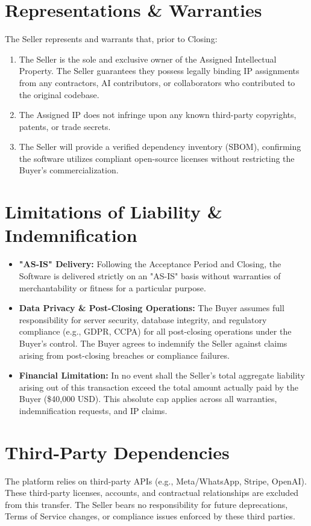 \documentclass[11pt,a4paper]{report}
\begin{document}
\section{Representations \& Warranties}
The Seller represents and warrants that, prior to Closing:
\begin{enumerate}
    \item The Seller is the sole and exclusive owner of the Assigned Intellectual Property. The Seller guarantees they possess legally binding IP assignments from any contractors, AI contributors, or collaborators who contributed to the original codebase.
    \item The Assigned IP does not infringe upon any known third-party copyrights, patents, or trade secrets.
    \item The Seller will provide a verified dependency inventory (SBOM), confirming the software utilizes compliant open-source licenses without restricting the Buyer's commercialization.
\end{enumerate}

\section{Limitations of Liability \& Indemnification}
\begin{itemize}
    \item \textbf{"AS-IS" Delivery:} Following the Acceptance Period and Closing, the Software is delivered strictly on an "AS-IS" basis without warranties of merchantability or fitness for a particular purpose.
    \item \textbf{Data Privacy \& Post-Closing Operations:} The Buyer assumes full responsibility for server security, database integrity, and regulatory compliance (e.g., GDPR, CCPA) for all post-closing operations under the Buyer's control. The Buyer agrees to indemnify the Seller against claims arising from post-closing breaches or compliance failures.
    \item \textbf{Financial Limitation:} In no event shall the Seller's total aggregate liability arising out of this transaction exceed the total amount actually paid by the Buyer (\$40,000 USD). This absolute cap applies across all warranties, indemnification requests, and IP claims.
\end{itemize}

\section{Third-Party Dependencies}
The platform relies on third-party APIs (e.g., Meta/WhatsApp, Stripe, OpenAI). These third-party licenses, accounts, and contractual relationships are excluded from this transfer. The Seller bears no responsibility for future deprecations, Terms of Service changes, or compliance issues enforced by these third parties.
\end{document}
